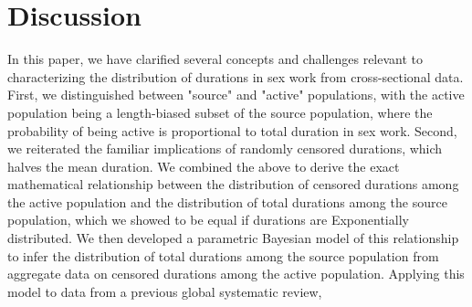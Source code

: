 \section{Discussion}\label{disc}
\par %
In this paper, we have clarified several concepts and challenges relevant to
characterizing the distribution of durations in sex work from cross-sectional data.
First, we distinguished between "source" and "active" populations,
with the active population being a length-biased subset of the source population,
where the probability of being active is proportional to total duration in sex work.
Second, we reiterated the familiar implications of randomly censored durations,
which halves the mean duration.
We combined the above to derive the exact mathematical relationship between
the distribution of censored durations among the active population and
the distribution of total durations among the source population,
which we showed to be equal if durations are Exponentially distributed.
We then developed a parametric Bayesian model of this relationship
to infer the distribution of total durations among the source population
from aggregate data on censored durations among the active population.
Applying this model to data from a previous global systematic review,\cite{Fazito2012}
